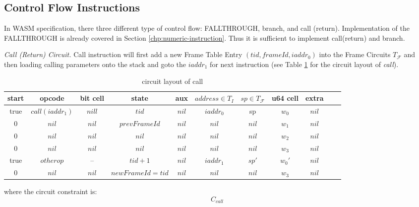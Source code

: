 \subsection{Control Flow Instructions}
In WASM specification, there three different type of control flow: FALLTHROUGH, branch, and call (return). Implementation of the FALLTHROUGH is already covered in Section \ref{chp:numeric-instruction}. Thus it is sufficient to implement call(return) and branch.

\smallskip\noindent\emph{Call (Return) Circuit.}
Call instruction will first add a new Frame Table Entry $(tid, frameId, iaddr_0)$ into the Frame Circuits $T_\mathcal{F}$ and then loading calling parameters onto the stack and goto the $iaddr_1$ for next instruction (see Table \ref{tbl:call-instruction} for the circuit layout of \emph{call}).
\begin{table}[!h]
\begin{center}
\begin{tabular}{ | c | c | c | c | c | c | c | c | c | c | c | }
  \hline
  start & opcode & bit cell & state & aux & $address \in T_{I}$ & $sp \in T_\mathcal{F}$& u64 cell & extra \\ 
  \hline
   true & $call(iaddr_1)$ & $nill$ & $tid$ & $nil$ & $iaddr_0$ & sp & $w_0$ & $nil$\\ 
 \hline
   0 & $nil$ & $nil$ & $prevFrameId$ & $nil$ & $nil$ & $nil$ & $w_1$ & $nil$\\ 
 \hline
   0 & $nil$ & $nil$ & $nil$ & $nil$ & $nil$ & $nil$ & $w_2$ & $nil$\\ 
 \hline
   0 & $nil$ & $nil$ & $nil$ & $nil$ & $nil$ & $nil$ & $w_3$ & $nil$\\ 
 \hline
   true & $otherop$ & -- & $tid + 1$ & $nil$ & $iaddr_1$ & $sp'$ & $w_0'$ & $nil$\\
 \hline
   0 & $nil$ & $nil$ & $newFrameId = tid$ & $nil$ & $nil$ & $nil$ & $w_3$ & $nil$\\ 
 \hline
\end{tabular}
\caption{circuit layout of call}
\label{tbl:call-instruction}
\end{center}
\end{table}
where the circuit constraint is:
\[
    C_{call} 
\]

